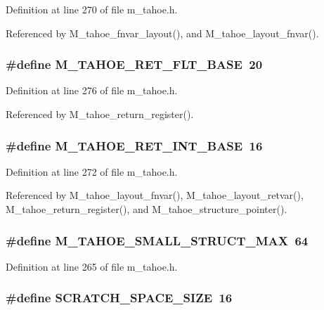Definition at line 270 of file m\_\-tahoe.h.

Referenced by M\_\-tahoe\_\-fnvar\_\-layout(), and M\_\-tahoe\_\-layout\_\-fnvar().
\subsubsection{\setlength{\rightskip}{0pt plus 5cm}\#define M\_\-TAHOE\_\-RET\_\-FLT\_\-BASE~20}\label{m__tahoe_8h_483e74b71c0ae94f0843c7f4301d8b4d}




Definition at line 276 of file m\_\-tahoe.h.

Referenced by M\_\-tahoe\_\-return\_\-register().
\subsubsection{\setlength{\rightskip}{0pt plus 5cm}\#define M\_\-TAHOE\_\-RET\_\-INT\_\-BASE~16}\label{m__tahoe_8h_5ebd79692362c86bec632173ae0edb51}




Definition at line 272 of file m\_\-tahoe.h.

Referenced by M\_\-tahoe\_\-layout\_\-fnvar(), M\_\-tahoe\_\-layout\_\-retvar(), M\_\-tahoe\_\-return\_\-register(), and M\_\-tahoe\_\-structure\_\-pointer().
\subsubsection{\setlength{\rightskip}{0pt plus 5cm}\#define M\_\-TAHOE\_\-SMALL\_\-STRUCT\_\-MAX~64}\label{m__tahoe_8h_fe9fe073d1f95a9aa2d9699b352949d8}




Definition at line 265 of file m\_\-tahoe.h.
\subsubsection{\setlength{\rightskip}{0pt plus 5cm}\#define SCRATCH\_\-SPACE\_\-SIZE~16}\label{m__tahoe_8h_190a9fcd48ca9ff330512fe5bc0b1221}




